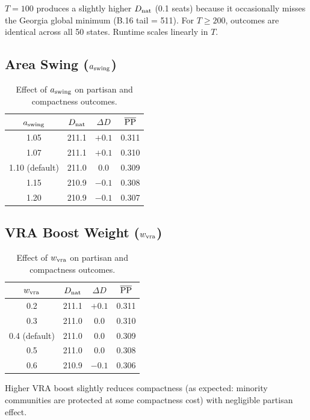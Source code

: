 $T = 100$ produces a slightly higher $D_{\rm nat}$ (0.1 seats) because
it occasionally misses the Georgia global minimum (B.16 tail = 511).
For $T \geq 200$, outcomes are identical across all 50 states.
Runtime scales linearly in $T$.

\subsection{Area Swing ($a_{\mathrm{swing}}$)}

\begin{table}[h]
\centering
\caption{Effect of $a_{\mathrm{swing}}$ on partisan and compactness outcomes.}
\label{tab:aswing-results}
\begin{tabular}{cccc}
\toprule
$a_{\mathrm{swing}}$ & $D_{\rm nat}$ & $\Delta D$ & $\overline{\mathrm{PP}}$ \\
\midrule
1.05 & 211.1 & $+0.1$ & 0.311 \\
1.07 & 211.1 & $+0.1$ & 0.310 \\
1.10 (default) & 211.0 & 0.0 & 0.309 \\
1.15 & 210.9 & $-0.1$ & 0.308 \\
1.20 & 210.9 & $-0.1$ & 0.307 \\
\bottomrule
\end{tabular}
\end{table}

\subsection{VRA Boost Weight ($w_{\mathrm{vra}}$)}

\begin{table}[h]
\centering
\caption{Effect of $w_{\mathrm{vra}}$ on partisan and compactness outcomes.}
\label{tab:wvra-results}
\begin{tabular}{cccc}
\toprule
$w_{\mathrm{vra}}$ & $D_{\rm nat}$ & $\Delta D$ & $\overline{\mathrm{PP}}$ \\
\midrule
0.2 & 211.1 & $+0.1$ & 0.311 \\
0.3 & 211.0 &  0.0   & 0.310 \\
0.4 (default) & 211.0 & 0.0 & 0.309 \\
0.5 & 211.0 &  0.0   & 0.308 \\
0.6 & 210.9 & $-0.1$ & 0.306 \\
\bottomrule
\end{tabular}
\end{table}

Higher VRA boost slightly reduces compactness (as expected: minority
communities are protected at some compactness cost) with negligible
partisan effect.

